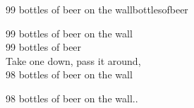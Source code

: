 \begin{song}{99 bottles of beer on the wall}{bottlesofbeer}
\begin{vers}
99 bottles of beer on the wall\\
99 bottles of beer\\
Take one down, pass it around, \\
98 bottles of beer on the wall\\
\end{vers}
\begin{vers}
98 bottles of beer on the wall..\\
\end{vers}
\end{song}
